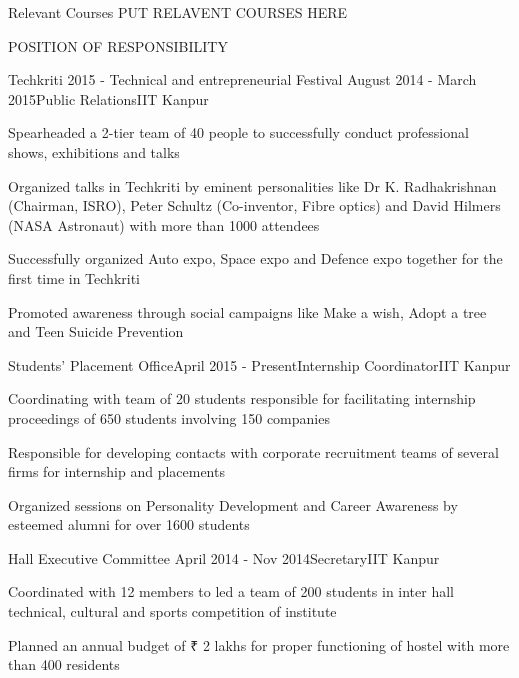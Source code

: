 \documentclass{resume} %
\begin{document}
    \begin{rSection}{Relevant Courses}
        PUT RELAVENT COURSES HERE

    \end{rSection}

    \begin{rSection}{POSITION OF RESPONSIBILITY}

    \begin{rSubsection}{Techkriti 2015 - Technical and entrepreneurial Festival }{August 2014 - March 2015}{Public Relations}{IIT Kanpur}
    \item Spearheaded a 2-tier team of 40 people to successfully conduct professional shows, exhibitions and talks
    \item Organized talks in Techkriti by eminent personalities like Dr K. Radhakrishnan (Chairman, ISRO), Peter Schultz (Co-inventor, Fibre optics) and David Hilmers (NASA Astronaut) with more than 1000 attendees
    \item Successfully organized Auto expo, Space expo and Defence expo together for the first time in Techkriti
    \item Promoted awareness through social campaigns like Make a wish, Adopt a tree and Teen Suicide Prevention
    \end{rSubsection}


    \begin{rSubsection}{Students' Placement Office}{April 2015 - Present}{Internship Coordinator}{IIT Kanpur}
    \item Coordinating with team of 20 students responsible for facilitating internship proceedings of 650 students involving 150 companies
    \item Responsible for developing contacts with corporate recruitment teams of several firms for internship and placements 
    \item Organized sessions on Personality Development and Career Awareness by esteemed alumni for over 1600 students
    \end{rSubsection}


    \begin{rSubsection}{Hall Executive Committee }{April 2014 - Nov 2014}{Secretary}{IIT Kanpur}
    \item Coordinated with 12 members to led a team of 200 students in inter hall technical, cultural and sports competition of institute 
    \item Planned an annual budget of ₹ 2 lakhs for proper functioning of hostel with more than 400 residents
    \end{rSubsection}

    \end{rSection}
\end{document}
